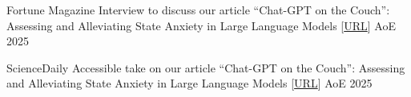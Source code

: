
\begin{cvhonors}

   \cvhonor
    {Fortune Magazine} %
    {Interview to discuss our article “Chat-GPT on the Couch”: Assessing and Alleviating State Anxiety in Large Language Models [\href{https://fortune.com/2025/03/09/openai-chatgpt-anxiety-mindfulness-mental-health-intervention/?abc123}{URL}]} %
    {AoE} %
    {2025} %
    
  \cvhonor
    {ScienceDaily} %
    {Accessible take on our article “Chat-GPT on the Couch”: Assessing and Alleviating State Anxiety in Large Language Models [\href{https://www.sciencedaily.com/releases/2025/03/250303141645.htm}{URL}]} %
    {AoE} %
    {2025} %

    \\
    
\end{cvhonors}

